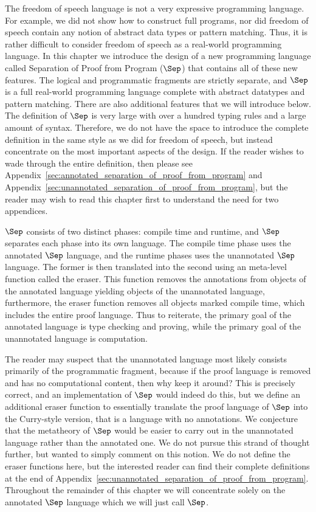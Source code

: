 The freedom of speech language is not a very expressive programming
language.  For example, we did not show how to construct full
programs, nor did freedom of speech contain any notion of abstract
data types or pattern matching.  Thus, it is rather difficult to
consider freedom of speech as a real-world programming language.  In
this chapter we introduce the design of a new programming language
called Separation of Proof from Program ($\Sep$) that contains all of
these new features.  The logical and programmatic fragments are
strictly separate, and $\Sep$ is a full real-world programming
language complete with abstract datatypes and pattern matching.  There
are also additional features that we will introduce below.  The
definition of $\Sep$ is very large with over a hundred typing rules
and a large amount of syntax.  Therefore, we do not have the space to
introduce the complete definition in the same style as we did for
freedom of speech, but instead concentrate on the most important
aspects of the design.  If the reader wishes to wade through the
entire definition, then please see
Appendix~\ref{sec:annotated_separation_of_proof_from_program} and
Appendix~\ref{sec:unannotated_separation_of_proof_from_program}, but
the reader may wish to read this chapter first to understand the need
for two appendices.

$\Sep$ consists of two distinct phases: compile time and runtime, and
$\Sep$ separates each phase into its own language.  The compile time
phase uses the annotated $\Sep$ language, and the runtime phases uses
the unannotated $\Sep$ language.  The former is then translated into
the second using an meta-level function called the eraser.  This
function removes the annotations from objects of the annotated
language yielding objects of the unannotated language, furthermore, the
eraser function removes all objects marked compile time, which
includes the entire proof language.  Thus to reiterate, the primary
goal of the annotated language is type checking and proving, while the
primary goal of the unannotated language is computation.  

The reader may suspect that the unannotated language most likely
consists primarily of the programmatic fragment, because if the proof
language is removed and has no computational content, then why keep it
around?  This is precisely correct, and an implementation of $\Sep$
would indeed do this, but we define an additional eraser function to
essentially translate the proof language of $\Sep$ into the
Curry-style version, that is a language with no annotations.  We
conjecture that the metatheory of $\Sep$ would be easier to carry out
in the unannotated language rather than the annotated one.  We do not
pursue this strand of thought further, but wanted to simply comment on
this notion. We do not define the eraser functions here, but the
interested reader can find their complete definitions at the end of
Appendix~\ref{sec:unannotated_separation_of_proof_from_program}.
Throughout the remainder of this chapter we will concentrate solely on
the annotated $\Sep$ language which we will just call $\Sep$.


